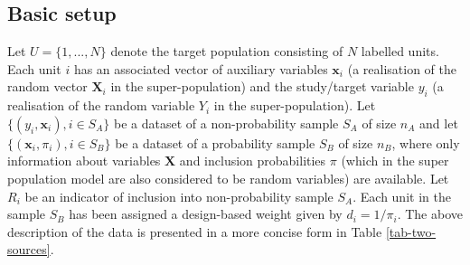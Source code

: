 \documentclass[
]{jss}
\begin{document}
\subsection{Basic setup}\label{basic-setup}

Let \(U=\{1,..., N\}\) denote the target population consisting of \(N\)
labelled units. Each unit \(i\) has an associated vector of auxiliary
variables \(\boldsymbol{x}_{i}\) (a realisation of the random vector
\(\boldsymbol{X}_{i}\) in the super-population) and the study/target
variable \(y_{i}\) (a realisation of the random variable \(Y_{i}\) in
the super-population). Let \(\{ (y_i, \boldsymbol{x}_i), i \in S_A\}\)
be a dataset of a non-probability sample \(S_A\) of size \(n_A\) and let
\(\{\left(\boldsymbol{x}_i, \pi_{i}\right), i \in S_B\}\) be a dataset
of a probability sample \(S_B\) of size \(n_B\), where only information
about variables \(\boldsymbol{X}\) and inclusion probabilities \(\pi\)
(which in the super population model are also considered to be random
variables) are available. Let \(R_i\) be an indicator of inclusion into
non-probability sample \(S_A\). Each unit in the sample \(S_B\) has been
assigned a design-based weight given by \(d_i = 1/\pi_i\). The above
description of the data is presented in a more concise form in Table
\ref{tab-two-sources}.

\begin{table}[ht!]
    \centering
    \caption{Two sample setting.}
    \label{tab-two-sources}
\end{table}
\end{document}
